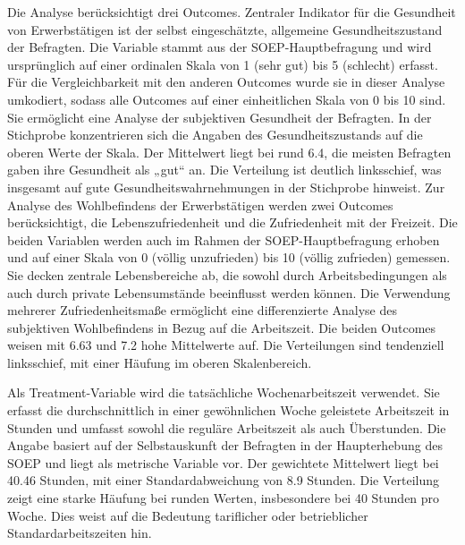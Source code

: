 \documentclass[12pt,a4paper]{article}
\begin{document}
Die Analyse berücksichtigt drei Outcomes. Zentraler Indikator für die Gesundheit von Erwerbstätigen ist der selbst eingeschätzte, allgemeine Gesundheitszustand der Befragten. Die Variable stammt aus der SOEP-Hauptbefragung und wird ursprünglich auf einer ordinalen Skala von 1 (sehr gut) bis 5 (schlecht) erfasst. Für die Vergleichbarkeit mit den anderen Outcomes wurde sie in dieser Analyse umkodiert, sodass alle Outcomes auf einer einheitlichen Skala von 0 bis 10  sind. Sie ermöglicht eine Analyse der subjektiven Gesundheit der Befragten. In der Stichprobe konzentrieren sich die Angaben des Gesundheitszustands auf die oberen Werte der Skala. Der Mittelwert liegt bei rund 6.4, die meisten Befragten gaben ihre Gesundheit als „gut“ an.  Die Verteilung ist deutlich linksschief, was insgesamt auf gute Gesundheitswahrnehmungen in der Stichprobe hinweist. Zur Analyse des Wohlbefindens der Erwerbstätigen werden zwei Outcomes berücksichtigt, die Lebenszufriedenheit und die Zufriedenheit mit der Freizeit. Die beiden Variablen werden auch im Rahmen der SOEP-Hauptbefragung erhoben und auf einer Skala von 0 (völlig unzufrieden) bis 10 (völlig zufrieden) gemessen. Sie decken zentrale Lebensbereiche ab, die sowohl durch Arbeitsbedingungen als auch durch private Lebensumstände beeinflusst werden können. Die Verwendung mehrerer Zufriedenheitsmaße ermöglicht eine differenzierte Analyse des subjektiven Wohlbefindens in Bezug auf die Arbeitszeit. Die beiden Outcomes weisen mit 6.63 und 7.2 hohe Mittelwerte auf. Die Verteilungen sind tendenziell linksschief, mit einer Häufung im oberen Skalenbereich. 

Als Treatment-Variable wird die tatsächliche Wochenarbeitszeit verwendet. Sie erfasst die durchschnittlich in einer gewöhnlichen Woche geleistete Arbeitszeit in Stunden und umfasst sowohl die reguläre Arbeitszeit als auch Überstunden. Die Angabe basiert auf der Selbstauskunft der Befragten in der Haupterhebung des SOEP und liegt als metrische Variable vor. Der gewichtete Mittelwert liegt bei 40.46 Stunden, mit einer Standardabweichung von 8.9 Stunden. Die Verteilung zeigt eine starke Häufung bei runden Werten, insbesondere bei 40 Stunden pro Woche. Dies weist auf die Bedeutung tariflicher oder betrieblicher Standardarbeitszeiten hin.
\end{document}
